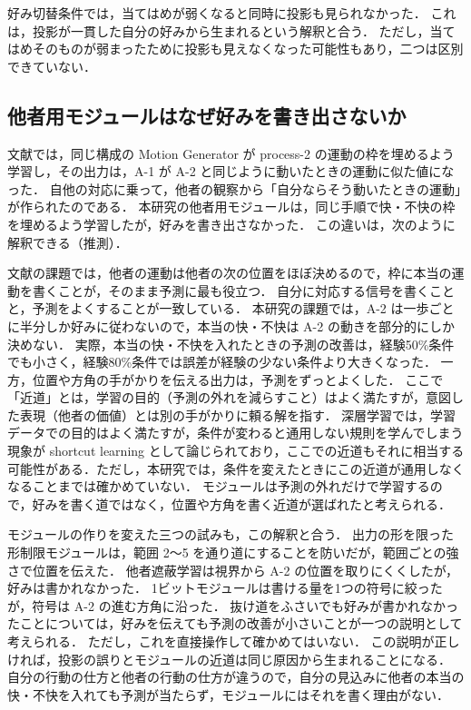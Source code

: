 好み切替条件では，当てはめが弱くなると同時に投影も見られなかった．
これは，投影が一貫した自分の好みから生まれるという解釈と合う．
ただし，当てはめそのものが弱まったために投影も見えなくなった可能性もあり，二つは区別できていない．

\subsection{他者用モジュールはなぜ好みを書き出さないか}\label{sec:disc-module}
文献\cite{noguchi2022superposition}では，同じ構成の Motion Generator が process-2 の運動の枠を埋めるよう学習し，その出力は，A-1 が A-2 と同じように動いたときの運動に似た値になった．
自他の対応に乗って，他者の観察から「自分ならそう動いたときの運動」が作られたのである．
本研究の他者用モジュールは，同じ手順で快・不快の枠を埋めるよう学習したが，好みを書き出さなかった．
この違いは，次のように解釈できる（推測）．

文献\cite{noguchi2022superposition}の課題では，他者の運動は他者の次の位置をほぼ決めるので，枠に本当の運動を書くことが，そのまま予測に最も役立つ．
自分に対応する信号を書くことと，予測をよくすることが一致している．
本研究の課題では，A-2 は一歩ごとに半分しか好みに従わないので，本当の快・不快は A-2 の動きを部分的にしか決めない．
実際，本当の快・不快を入れたときの予測の改善は，経験50\%条件でも小さく，経験80\%条件では誤差が経験の少ない条件より大きくなった．
一方，位置や方角の手がかりを伝える出力は，予測をずっとよくした．
ここで「近道」とは，学習の目的（予測の外れを減らすこと）はよく満たすが，意図した表現（他者の価値）とは別の手がかりに頼る解を指す．
深層学習では，学習データでの目的はよく満たすが，条件が変わると通用しない規則を学んでしまう現象が shortcut learning として論じられており\cite{geirhos2020shortcut}，ここでの近道もそれに相当する可能性がある．ただし，本研究では，条件を変えたときにこの近道が通用しなくなることまでは確かめていない．
モジュールは予測の外れだけで学習するので，好みを書く道ではなく，位置や方角を書く近道が選ばれたと考えられる．

モジュールの作りを変えた三つの試みも，この解釈と合う．
出力の形を限った形制限モジュールは，範囲 2〜5 を通り道にすることを防いだが，範囲ごとの強さで位置を伝えた．
他者遮蔽学習は視界から A-2 の位置を取りにくくしたが，好みは書かれなかった．
1ビットモジュールは書ける量を1つの符号に絞ったが，符号は A-2 の進む方角に沿った．
抜け道をふさいでも好みが書かれなかったことについては，好みを伝えても予測の改善が小さいことが一つの説明として考えられる．
ただし，これを直接操作して確かめてはいない．
この説明が正しければ，投影の誤りとモジュールの近道は同じ原因から生まれることになる．
自分の行動の仕方と他者の行動の仕方が違うので，自分の見込みに他者の本当の快・不快を入れても予測が当たらず，モジュールにはそれを書く理由がない．

